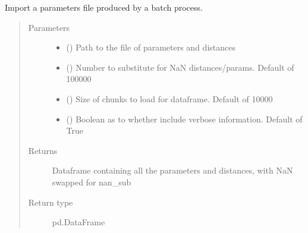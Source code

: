\documentclass[letterpaper,10pt,english]{sphinxmanual}
\begin{document}
\begin{fulllineitems}
\label{\detokenize{misc:bayescmd.results_handling.data_import}}
Import a parameters file produced by a batch process.
\begin{quote}\begin{description}
\item[{Parameters}] \leavevmode\begin{itemize}
\item {} 
 () \textendash{} Path to the file of parameters and distances

\item {} 
 (\sphinxstyleliteralemphasis{, }) \textendash{} Number to substitute for NaN distances/params. Default of 100000

\item {} 
 (\sphinxstyleliteralemphasis{, }) \textendash{} Size of chunks to load for dataframe. Default of 10000

\item {} 
 (\sphinxstyleliteralemphasis{, }) \textendash{} Boolean as to whether include verbose information. Default of True

\end{itemize}

\item[{Returns}] \leavevmode
{} \textendash{} Dataframe containing all the parameters and distances, with NaN swapped
for nan\_sub

\item[{Return type}] \leavevmode
pd.DataFrame

\end{description}\end{quote}

\end{fulllineitems}

\end{document}
